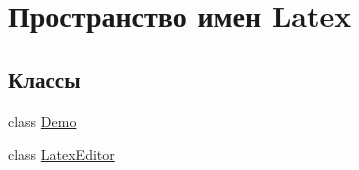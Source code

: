 \hypertarget{namespace_latex}{}\section{Пространство имен Latex}
\label{namespace_latex}
\subsection*{Классы}
\begin{DoxyCompactItemize}
\item 
class \hyperlink{class_latex_1_1_demo}{Demo}
\item 
class \hyperlink{class_latex_1_1_latex_editor}{Latex\+Editor}
\end{DoxyCompactItemize}

